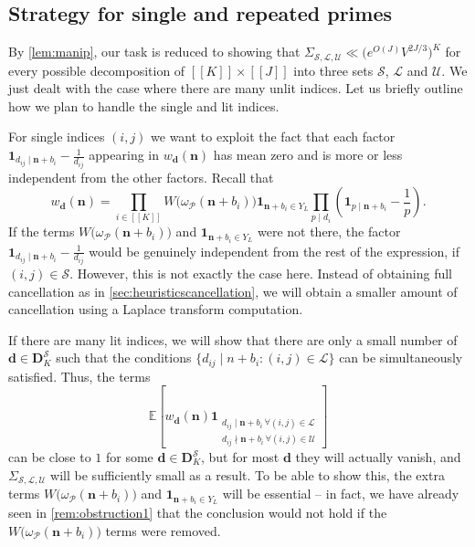 \documentclass[11pt]{amsart}
\theoremstyle{definition}
\newcommand{\sinterval}[1]{[\![#1]\!] }
\newcommand{\ind}[1]{\mathbf{1}_{#1}}
\newcommand{\E}{\mathbb{E}}
\newcommand{\primes}{\mathcal{P}}
\renewcommand{\d}{\boldsymbol{d}}
\newcommand{\pcomp}[2]{d_{#1#2}}
\newcommand{\n}{\mathbf{n}}
\newcommand{\curlyLexp}[1]{V^{#1}}
\newcommand{\sommespart}{b}
\newcommand{\lit}{\mathcal{L}}
\newcommand{\unlit}{\mathcal{U}}
\newcommand{\s}{\mathcal{S}}
\newcommand{\fancyD}{\mathbf{D}}
\newcommand{\Ds}{\fancyD^{\s}_{\!\repK}}
\newcommand{\elln}{L}
\newcommand{\Y}{Y_{\!\elln}}
\newcommand{\repR}{J}
\newcommand{\repK}{K}
\newcommand{\newK}{\sinterval{K}}
\newcommand{\newR}{\sinterval{J}}
\begin{document}
\subsection{Strategy for single and repeated primes}
\label{sec:strategy}
By \cref{lem:manip}, our task is reduced to showing that $\Sigma_{\s,\lit,\unlit} \ll \big( e^{O(\repR)} \curlyLexp{2\repR/3}\big)^{\repK}$ for every possible decomposition of $\newK\times \newR$ into three sets $\s$, $\lit$ and $\unlit$. We just dealt with the case where there are many unlit indices. Let us briefly outline how we plan to handle the single and lit indices. 

For single indices $(i,j)$ we want to exploit the fact that each factor $\ind{\pcomp{i}{j}\mid \n + \sommespart_i} - \frac{1}{\pcomp{i}{j}}$ appearing in $w_{\d}(\n)$ has mean zero and is more or less independent from the other factors. Recall that 
	\begin{equation*}
		w_{\d}(\n) = \prod_{i\in \newK} W\big(\omega_{\primes}(\n+\sommespart_i)\big) \ind{\n+\sommespart_i\in \Y} \prod_{p\mid d_i} \left(\ind{p\mid \n + \sommespart_i} - \frac{1}{p}\right).
	\end{equation*}
	If the terms $W\big(\omega_{\primes}(\n+\sommespart_i)\big)$ and $\ind{\n+\sommespart_i\in \Y}$ were not there, the factor $\ind{\pcomp{i}{j}\mid \n + \sommespart_i} - \frac{1}{\pcomp{i}{j}}$ would be genuinely independent from the rest of the expression, if $(i,j)\in \s$.	However, this is not exactly the case here. Instead of obtaining full cancellation as in \cref{sec:heuristicscancellation}, we will obtain a smaller amount of cancellation using a Laplace transform computation. 
	
	If there are many lit indices, we will show that there are only a small number of $\d\in \Ds$ such that the conditions $\{\pcomp{i}{j}\mid n+\sommespart_i : (i,j)\in \lit\}$ can be simultaneously satisfied. Thus, the terms
	\begin{equation*}
		\E \left[w_{\d}(\n) \ind{\substack{\pcomp{i}{j}\mid \n+\sommespart_i \, \forall (i,j)\in \lit \\ \pcomp{i}{j}\nmid \n+\sommespart_i \, \forall (i,j)\in \unlit}} \right]
	\end{equation*} 
	can be close to $1$ for some $\d\in \Ds$, but for most $\d$ they will actually vanish, and $\Sigma_{\s,\lit,\unlit}$ will be sufficiently small as a result. To be able to show this, the extra terms $W\big(\omega_{\primes}(\n+\sommespart_i)\big)$ and $\ind{\n+\sommespart_i\in \Y}$ will be essential -- in fact, we have already seen in \cref{rem:obstruction1} that the conclusion would not hold if the $W\big(\omega_{\primes}(\n+\sommespart_i)\big)$ terms were removed.
\end{document}
